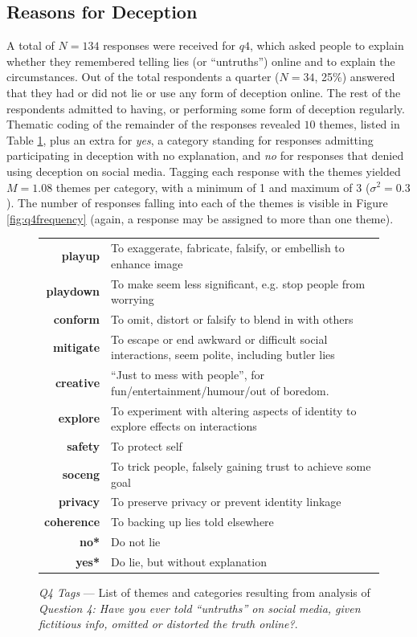 \documentclass{sig-alternate}
\begin{document}
\subsection{Reasons for Deception} \label{sec:reasons}

A total of $N=134$ responses were received for $q4$, which asked people to explain whether they remembered telling lies (or ``untruths'') online and to explain the circumstances.  Out of the total respondents a quarter ($N=34$, 25\%) answered that they had or did not lie or use any form of deception online. The rest of the respondents admitted to having, or performing some form of deception regularly.  Thematic coding of the remainder of the responses revealed $10$ themes, listed in Table \ref{fig:q4themes}, plus an extra for \emph{yes}, a category standing for responses admitting participating in deception with no explanation, and \emph{no} for responses that denied using deception on social media. Tagging each response with the themes yielded $M=1.08$ themes per category, with a minimum of 1 and maximum of 3 ($\sigma^2=0.3$).  The number of responses falling into each of the themes is visible in Figure \ref{fig:q4frequency} (again, a response may be assigned to more than one theme).

\begin{figure}[tbp]
        \small
    \begin{tabular}{  r | p{5.5cm}  }
        \textbf{playup} & To exaggerate, fabricate, falsify, or embellish to enhance image \\
        \textbf{playdown} & To make seem less significant, e.g. stop people from worrying \\
        \textbf{conform} & To omit, distort or falsify to blend in with others  \\
        \textbf{mitigate} & To escape or end awkward or difficult social interactions,  seem polite, including butler lies \\
        \textbf{creative} & ``Just to mess with people'', for fun/entertainment/humour/out of boredom. \\
        \textbf{explore} & To experiment with altering aspects of identity to explore effects on interactions \\
        \textbf{safety} & To protect self \\
        \textbf{soceng} & To trick people, falsely gaining trust to achieve some goal \\
        \textbf{privacy} & To preserve privacy or prevent identity linkage \\
        \textbf{coherence} & To backing up lies told elsewhere \\
        \textbf{no*} & Do not lie \\
        \textbf{yes*} & Do lie, but without explanation \\
    \end{tabular}
    \caption{\emph{Q4 Tags} --- List of themes and categories resulting from analysis of \emph{Question 4: Have you ever told ``untruths'' on social media, given fictitious info, omitted or distorted the truth online?}.} \label{fig:q4themes}
\end{figure}
\end{document}
